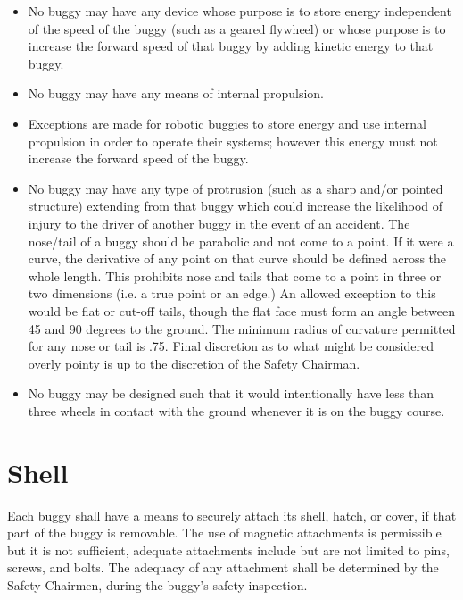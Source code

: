 	\begin{itemize}

		\item
		No buggy may have any device whose purpose is to store energy independent of the speed of the buggy (such as a geared flywheel) or whose purpose is to increase the forward speed of that buggy by adding kinetic energy to that buggy.

		\item
		No buggy may have any means of internal propulsion.

		\item
		Exceptions are made for robotic buggies to store energy and use internal propulsion in order to operate their systems; however this energy must not increase the forward speed of the buggy. 

		\item
		No buggy may have any type of protrusion (such as a sharp and/or pointed structure) extending from that buggy which could increase the likelihood of injury to the driver of another buggy in the event of an accident. The nose/tail of a buggy should be parabolic and not come to a point. If it were a curve, the derivative of any point on that curve should be defined across the whole length. This prohibits nose and tails that come to a point in three or two dimensions (i.e. a true point or an edge.) An allowed exception to this would be flat or cut-off tails, though the flat face must form an angle between 45 and 90 degrees to the ground. The minimum radius of curvature permitted for any nose or tail is .75. Final discretion as to what might be considered overly pointy is up to the discretion of the Safety Chairman.

		\item
		No buggy may be designed such that it would intentionally have less than three wheels in contact with the ground whenever it is on the buggy course.

	\end{itemize}

\section{Shell}

	Each buggy shall have a means to securely attach its shell, hatch, or cover, if that part of the buggy is removable. The use of magnetic attachments is permissible but it is not sufficient, adequate attachments include but are not limited to pins, screws, and bolts. The adequacy of any attachment shall be determined by the Safety Chairmen, during the buggy’s safety inspection.


